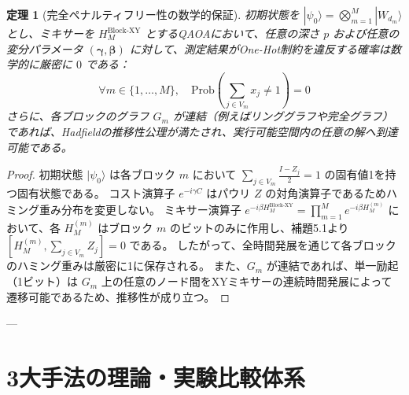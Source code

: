 \documentclass[11pt,a4paper]{ltjsarticle}
\theoremstyle{definition}
\theoremstyle{plain}
\newtheorem{theorem}{定理}[section]
\theoremstyle{remark}
\newcommand{\ket}[1]{|#1\rangle}
\begin{document}
\begin{theorem}[完全ペナルティフリー性の数学的保証]
初期状態を $\ket{\psi_0} = \bigotimes_{m=1}^M \ket{W_{d_m}}$ とし、ミキサーを $H_M^{\text{Block-XY}}$ とするQAOAにおいて、任意の深さ $p$ および任意の変分パラメータ $(\bm{\gamma}, \bm{\beta})$ に対して、測定結果がOne-Hot制約を違反する確率は数学的に厳密に $0$ である：
\begin{equation}
\forall m \in \{1, \dots, M\}, \quad \text{Prob}\left(\sum_{j \in V_m} x_j \neq 1\right) = 0
\end{equation}
さらに、各ブロックのグラフ $G_m$ が連結（例えばリンググラフや完全グラフ）であれば、Hadfieldの推移性公理が満たされ、実行可能空間内の任意の解へ到達可能である。
\end{theorem}
\begin{proof}
初期状態 $\ket{\psi_0}$ は各ブロック $m$ において $\sum_{j \in V_m} \frac{I - Z_j}{2} = 1$ の固有値1を持つ固有状態である。
コスト演算子 $e^{-i \gamma C}$ はパウリ $Z$ の対角演算子であるためハミング重み分布を変更しない。
ミキサー演算子 $e^{-i \beta H_M^{\text{Block-XY}}} = \prod_{m=1}^M e^{-i \beta H_M^{(m)}}$ において、各 $H_M^{(m)}$ はブロック $m$ のビットのみに作用し、補題5.1より $[H_M^{(m)}, \sum_{j \in V_m} Z_j] = 0$ である。
したがって、全時間発展を通じて各ブロックのハミング重みは厳密に1に保存される。
また、$G_m$ が連結であれば、単一励起（1ビット）は $G_m$ 上の任意のノード間をXYミキサーの連続時間発展によって遷移可能であるため、推移性が成り立つ。
\end{proof}

---

\section{3大手法の理論・実験比較体系}
\end{document}
